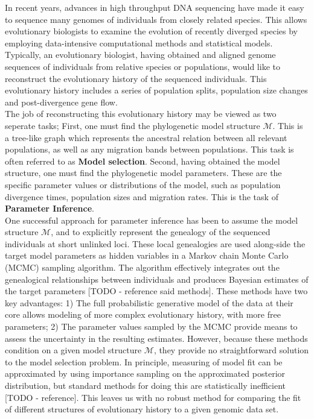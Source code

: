 \documentclass[11pt]{article}
\newcommand{\M}{\mathcal{M}}
\newcommand{\1}{\mathbbm{1}}
\begin{document}
In recent years, advances in high throughput DNA sequencing have made it easy to sequence many genomes of individuals from closely related species. This allows evolutionary biologists to examine the evolution of recently diverged species by employing data-intensive computational methods and statistical models.
%
Typically, an evolutionary biologist, having obtained and aligned genome sequences of individuals from relative species or populations, would like to reconstruct the evolutionary history of the sequenced individuals. This evolutionary history includes a series of population splits, population size changes and post-divergence gene flow.\\
%
The job of reconstructing this evolutionary history may be viewed as two seperate tasks; First, one must find the phylogenetic model structure $\M$. This is a tree-like graph which represents the ancestral relation between all relevant populations, as well as any migration bands between populations. This task is often referred to as \textbf{Model selection}. Second, having obtained the model structure, one must find the phylogenetic model parameters. These are the specific parameter values or distributions of the model, such as population divergence times, population sizes and migration rates. This is the task of \textbf{Parameter Inference}.\\
%
One successful approach for parameter inference has been to assume the model structure $\M$, and to explicitly represent the genealogy of the sequenced individuals at short unlinked loci. These local genealogies are used along-side the target model parameters as hidden variables in a Markov chain Monte Carlo (MCMC) sampling algorithm. The algorithm effectively integrates out the genealogical relationships between individuals and produces Bayesian estimates of the target parameters [TODO - reference said methods].
%
These methods have two key advantages: 1) The full probabilistic generative model of the data at their core allows modeling of 	more complex evolutionary history, with more free parameters; 2) The parameter values sampled by the MCMC provide means to assess the uncertainty in the resulting estimates.
%
However, because these methods condition on a given model structure $\M$, they provide no straightforward solution to the model selection problem.
%
In principle, measuring of model fit can be approximated by using importance sampling on the approximated posterior distribution, but standard methods for doing this are statistically inefficient [TODO - reference].
%
This leaves us with no robust method for comparing the fit of different structures of evolutionary history to a given genomic data set.\\
\end{document}

